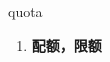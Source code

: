 
\begin{frame}
{\huge quota}
\begin{center}
\begin{enumerate}\Large
  \item \textbf{配额，限额}
\end{enumerate}
\end{center}
\end{frame}

